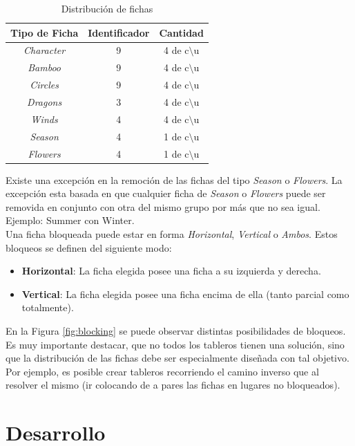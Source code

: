 \documentclass{sig-alternate}
\begin{document}
\begin{table}[h]
\begin{center}
	\begin{tabular}{|c|c|c|}
	\hline
	 Tipo de Ficha & Identificador & Cantidad\\
	\hline \hline
	\textit{Character} & 9 & 4 de c$\setminus$u \\
	\textit{Bamboo} & 9 & 4 de  c$\setminus$u  \\
	\textit{Circles} & 9 & 4 de  c$\setminus$u  \\
	\textit{Dragons} & 3 & 4 de  c$\setminus$u  \\	
	\textit{Winds} & 4 & 4 de  c$\setminus$u  \\
	\textit{Season} & 4 & 1 de c$\setminus$u \\
	\textit{Flowers} & 4 & 1 de  c$\setminus$u  \\
	\hline
	\end{tabular}
\end{center}
\caption{Distribuci\'on de fichas}
\label{tab:tiles}
\end{table}

	Existe una excepci\'on en la remoci\'on de las fichas del tipo \textit{Season} o \textit{Flowers}. La excepci\'on esta basada en que cualquier ficha de \textit{Season} o \textit{Flowers} puede ser removida en conjunto con otra del mismo grupo por m\'as que no sea igual. Ejemplo: Summer con Winter. \\
	Una ficha bloqueada puede estar en forma \textit{Horizontal}, \textit{Vertical} o \textit{Ambos}. Estos bloqueos se definen del siguiente modo:
	\begin{itemize}
		\item \textbf{Horizontal}: La ficha elegida posee una ficha a su izquierda y derecha.
		\item \textbf{Vertical}: La ficha elegida posee una ficha encima de ella (tanto parcial como totalmente).		
	\end{itemize}
	En la Figura \ref{fig:blocking} se puede observar distintas posibilidades de bloqueos.\\
	Es muy importante destacar, que no todos los tableros tienen una soluci\'on, sino que la distribuci\'on de las fichas debe ser especialmente dise\~nada con tal objetivo. Por ejemplo, es posible crear tableros recorriendo el camino inverso que al resolver el mismo (ir colocando de a pares las fichas en lugares no bloqueados).
\section*{Desarrollo}
\end{document}

